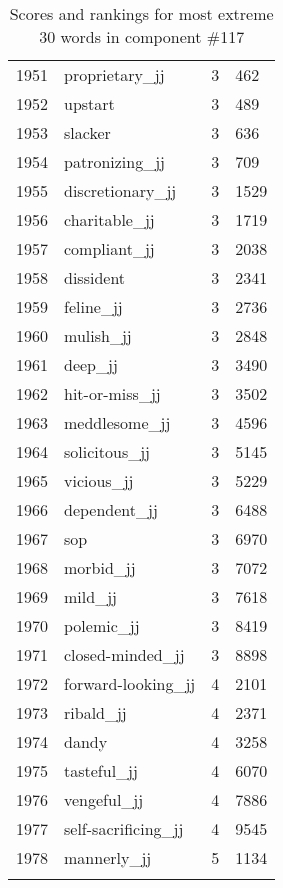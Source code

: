 \begin{longtable}[!htbp]{| rlr@{.}l |}
    1951 & proprietary\_jj & 3 & 462 \\
    1952 & upstart & 3 & 489 \\
    1953 & slacker & 3 & 636 \\
    1954 & patronizing\_jj & 3 & 709 \\
    1955 & discretionary\_jj & 3 & 1529 \\
    1956 & charitable\_jj & 3 & 1719 \\
    1957 & compliant\_jj & 3 & 2038 \\
    1958 & dissident & 3 & 2341 \\
    1959 & feline\_jj & 3 & 2736 \\
    1960 & mulish\_jj & 3 & 2848 \\
    1961 & deep\_jj & 3 & 3490 \\
    1962 & hit-or-miss\_jj & 3 & 3502 \\
    1963 & meddlesome\_jj & 3 & 4596 \\
    1964 & solicitous\_jj & 3 & 5145 \\
    1965 & vicious\_jj & 3 & 5229 \\
    1966 & dependent\_jj & 3 & 6488 \\
    1967 & sop & 3 & 6970 \\
    1968 & morbid\_jj & 3 & 7072 \\
    1969 & mild\_jj & 3 & 7618 \\
    1970 & polemic\_jj & 3 & 8419 \\
    1971 & closed-minded\_jj & 3 & 8898 \\
    1972 & forward-looking\_jj & 4 & 2101 \\
    1973 & ribald\_jj & 4 & 2371 \\
    1974 & dandy & 4 & 3258 \\
    1975 & tasteful\_jj & 4 & 6070 \\
    1976 & vengeful\_jj & 4 & 7886 \\
    1977 & self-sacrificing\_jj & 4 & 9545 \\
    1978 & mannerly\_jj & 5 & 1134 \\
    \hline
    \caption{Scores and rankings for most extreme 30 words in component \#117} \\
\end{longtable}
